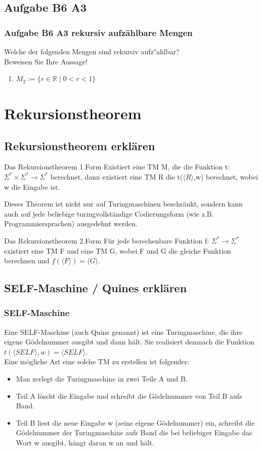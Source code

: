 \subsection{Aufgabe B6 A3}
\begin{frame}
	\frametitle{Aufgabe B6 A3 rekursiv aufzählbare Mengen}
	Welche der folgenden Mengen sind rekursiv aufz"ahlbar? \\
	Beweisen Sie Ihre Aussage!
	\begin{enumerate}
		\item $M_2 := \{r \in \mathbb{R} \; | \; 0<r<1\}$
	\end{enumerate}
\end{frame}

\section{Rekursionstheorem}
\subsection{Rekursionstheorem erklären}
\begin{frame}
\begin{block}{Das Rekursionstheorem 1.Form}
Existiert eine TM M, die die Funktion t: $\Sigma^* \times \Sigma^* \rightarrow \Sigma^*$ berechnet, dann existiert eine TM R die t($\langle R\rangle$,w) berechnet, wobei w die Eingabe ist.
\end{block}
Dieses Theorem ist nicht nur auf Turingmaschinen beschränkt, sondern kann auch auf jede beliebige turingvollständige Codierungsform (wie z.B. Programmiersprachen) ausgedehnt werden.
\begin{block}{Das Rekursionstheorem 2.Form}
Für jede berechenbare Funktion f: $\Sigma^*\rightarrow\Sigma^*$ existiert eine TM F und eine TM G, wobei F und G die gleiche Funktion berechnen und $f(\langle F\rangle)=\langle G\rangle$.\\
\end{block}
\end{frame}

\subsection{SELF-Maschine / Quines erklären}
\begin{frame}
\frametitle{SELF-Maschine}
Eine SELF-Maschine (auch Quine genannt) ist eine Turingmaschine, die ihre eigene Gödelnummer ausgibt und dann hält. Sie realisiert demnach die Funktion $t(\langle SELF\rangle,w)=\langle SELF\rangle$.\\
Eine mögliche Art eine solche TM zu erstellen ist folgender:
\begin{itemize}
\item Man zerlegt die Turingmaschine in zwei Teile A und B.
\item Teil A löscht die Eingabe und schreibt die Gödelnummer von Teil B aufs Band.
\item Teil B liest die neue Eingabe w (seine eigene Gödelnummer) ein, schreibt die Gödelnummer der Turingmaschine aufs Band die bei beliebiger Eingabe das Wort w ausgibt, hängt daran w an und hält.
\end{itemize}
\end{frame}

